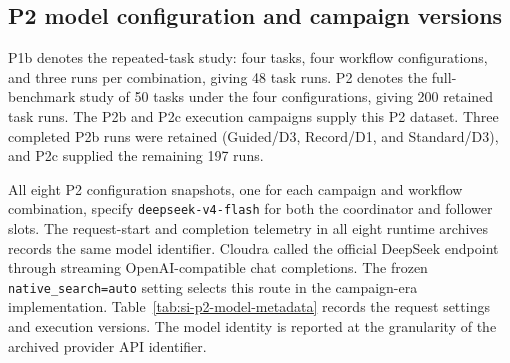 \subsection{P2 model configuration and campaign versions}
\label{sec:si-p2-model-metadata}

P1b denotes the repeated-task study: four tasks, four workflow configurations, and three runs per combination, giving 48 task runs. P2 denotes the full-benchmark study of 50 tasks under the four configurations, giving 200 retained task runs. The P2b and P2c execution campaigns supply this P2 dataset. Three completed P2b runs were retained (Guided/D3, Record/D1, and Standard/D3), and P2c supplied the remaining 197 runs.

All eight P2 configuration snapshots, one for each campaign and workflow combination, specify \texttt{deepseek-v4-flash} for both the coordinator and follower slots. The request-start and completion telemetry in all eight runtime archives records the same model identifier. Cloudra called the official DeepSeek endpoint through streaming OpenAI-compatible chat completions. The frozen \texttt{native\_search=auto} setting selects this route in the campaign-era implementation. Table~\ref{tab:si-p2-model-metadata} records the request settings and execution versions. The model identity is reported at the granularity of the archived provider API identifier.

